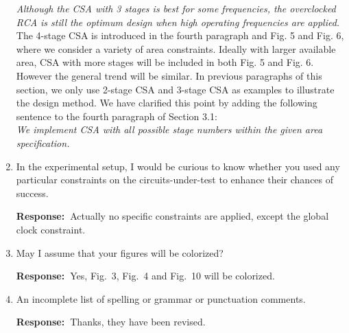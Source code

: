 \documentclass[a4paper, 11pt]{article}
\def\Response{\noindent \textbf{Response:~}}
\newcommand{\Question}[1]{\textcolor[rgb]{0.51,0.00,0.00}{#1}}
\newcommand{\PaperText}[1]{\emph{#1}}
\begin{document}
\begin{enumerate}
      \PaperText{Although the CSA with 3 stages is best for some frequencies, the overclocked RCA is still the optimum design when high operating frequencies are applied.}\\
      
      The 4-stage CSA is introduced in the fourth paragraph and Fig. 5 and Fig. 6, where we consider a variety of area constraints. Ideally with larger available area, CSA with more stages will be included in both Fig. 5 and Fig. 6. However the general trend will be similar. In previous paragraphs of this section, we only use 2-stage CSA and 3-stage CSA as examples to illustrate the design method. We have clarified this point by adding the following sentence to the fourth paragraph of Section 3.1:\\
      
      \PaperText{We implement CSA with all possible stage numbers within the given area specification.}\\
      
  \item \Question{In the experimental setup, I would be curious to know whether you used any particular constraints on the circuits-under-test to enhance their chances of success.}
      
      \Response Actually no specific constraints are applied, except the global clock constraint.
      
  \item \Question{May I assume that your figures will be colorized?}
        
      \Response Yes, Fig.~3, Fig.~4 and Fig.~10 will be colorized.
      
  \item \Question{An incomplete list of spelling or grammar or punctuation comments.}
      
      \Response Thanks, they have been revised.

      

\end{enumerate}
\end{document}
